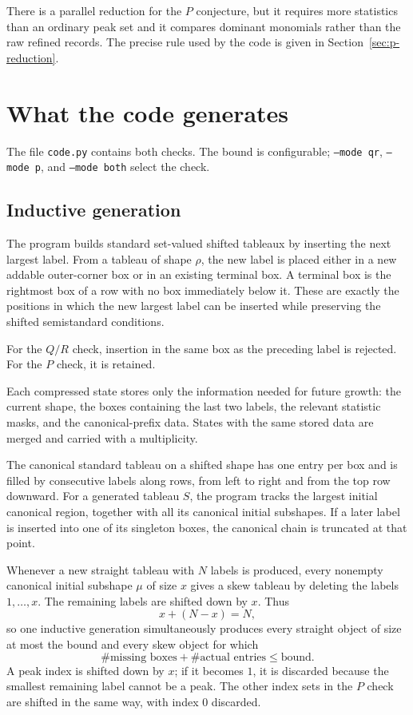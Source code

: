 \documentclass[11pt]{article}
\theoremstyle{definition}
\theoremstyle{remark}
\begin{document}
There is a parallel reduction for the $P$ conjecture, but it requires more
statistics than an ordinary peak set and it compares dominant monomials rather
than the raw refined records.  The precise rule used by the code is given in
Section~\ref{sec:p-reduction}.

\section{What the code generates}

The file \texttt{code.py} contains both checks.  The bound is configurable;
\texttt{--mode qr}, \texttt{--mode p}, and \texttt{--mode both} select the
check.

\subsection{Inductive generation}

The program builds standard set-valued shifted tableaux by inserting the next
largest label.  From a tableau of shape $\rho$, the new label is placed either
in a new addable outer-corner box or in an existing terminal box.  A terminal
box is the rightmost box of a row with no box immediately below it.  These are
exactly the positions in which the new largest label can be inserted while
preserving the shifted semistandard conditions.

For the $Q/R$ check, insertion in the same box as the preceding label is
rejected.  For the $P$ check, it is retained.

Each compressed state stores only the information needed for future growth:
the current shape, the boxes containing the last two labels, the relevant
statistic masks, and the canonical-prefix data.  States with the same stored
data are merged and carried with a multiplicity.

The canonical standard tableau on a shifted shape has one entry per box and is
filled by consecutive labels along rows, from left to right and from the top
row downward.  For a generated tableau $S$, the program tracks the largest
initial canonical region, together with all its canonical initial subshapes.
If a later label is inserted into one of its singleton boxes, the canonical
chain is truncated at that point.

Whenever a new straight tableau with $N$ labels is produced, every nonempty
canonical initial subshape $\mu$ of size $x$ gives a skew tableau by deleting
the labels $1,\ldots,x$.  The remaining labels are shifted down by $x$.  Thus
\[
  x+(N-x)=N,
\]
so one inductive generation simultaneously produces every straight object of
size at most the bound and every skew object for which
\[
  \#\text{missing boxes}+\#\text{actual entries}
  \le \text{bound}.
\]
A peak index is shifted down by $x$; if it becomes $1$, it is discarded because
the smallest remaining label cannot be a peak.  The other index sets in the
$P$ check are shifted in the same way, with index $0$ discarded.
\end{document}
